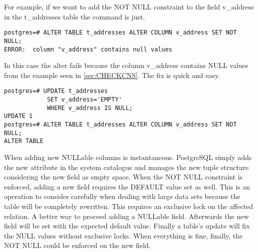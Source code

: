 For example, if we want to add the NOT NULL constraint to the field v\_address in the t\_addresses 
table the command is just.

\begin{lstlisting}[style=pgsql]
postgres=# ALTER TABLE t_addresses ALTER COLUMN v_address SET NOT NULL;
ERROR:  column "v_address" contains null values

\end{lstlisting}

In this case the alter fails because the column v\_address contains NULL values from the example 
seen in \ref{sec:CHECKCNS}. The fix is quick and easy. 

\begin{lstlisting}[style=pgsql]
postgres=# UPDATE t_addresses
            SET v_address='EMPTY'
            WHERE v_address IS NULL;
UPDATE 1
postgres=# ALTER TABLE t_addresses ALTER COLUMN v_address SET NOT NULL;
ALTER TABLE

\end{lstlisting}

When adding new NULLable columns is instantaneous. PostgreSQL simply adds the new attribute in the
system catalogue and manages the new tuple structure considering the new field as empty space.
When the NOT NULL constraint is enforced, adding a new field requires the DEFAULT value set as well. This
is an operation to consider carefully when dealing with large data sets because the table will be
completely rewritten. This requires an exclusive lock on the affected relation. A better way to proceed
adding a NULLable field. Afterwards the new field will be set with the expected default value. Finally a
table's update will fix the NULL values without exclusive locks. When everything is fine, finally, the
NOT NULL could be enforced on the new field.